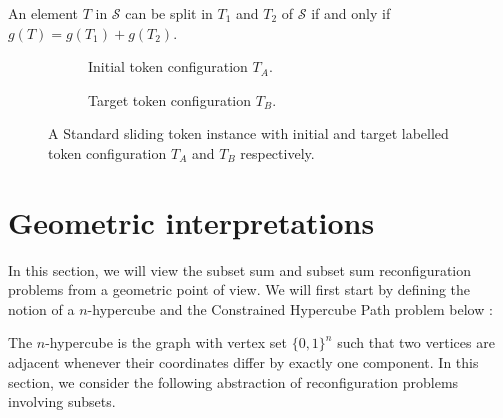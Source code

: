 \begin{example}
An element $T$ in $\mathcal{S}$ can be split in $T_1$ and $T_2$ of $\mathcal{S}$ if and only if $g(T) = g(T_1) + g(T_2)$.
\begin{figure}[H]
  \centering
  \begin{subfigure}[b]{0.4\textwidth}
    \begin{scaletikzpicturetowidth}{\textwidth}
    \end{scaletikzpicturetowidth}
    \caption{Initial token configuration $T_{A}$.}
    \label{fig:standard_1}
  \end{subfigure}
  \begin{subfigure}[b]{0.4\textwidth}
    \begin{scaletikzpicturetowidth}{\textwidth}
    \end{scaletikzpicturetowidth}
    \caption{Target token configuration $T_{B}$.}
    \label{fig:standard_2}
  \end{subfigure}
  \caption{A Standard sliding token instance with initial and target labelled token configuration $T_{A}$ and $T_{B}$ respectively.}
  \label{fig:input_instance_standard}
\end{figure}

\end{example}


\section{Geometric interpretations}
In this section, we will view the subset sum and subset sum reconfiguration problems from a geometric point of view.
We will first start by defining the notion of a $n$-hypercube and the Constrained Hypercube Path problem below :

The $n$-hypercube is the graph with vertex set $\{0, 1\}^n$ such that two vertices are adjacent whenever their coordinates differ by
exactly one component. In this section, we consider the following abstraction of reconfiguration problems involving subsets.

